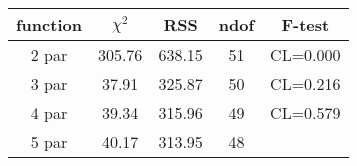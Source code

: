 \begin{tabular}{c|c|c|c|c}
function & $\chi^2$ & RSS & ndof & F-test \\
\hline
2 par & 305.76 & 638.15 & 51 & CL=0.000 \\
3 par & 37.91 & 325.87 & 50 & CL=0.216 \\
4 par & 39.34 & 315.96 & 49 & CL=0.579 \\
5 par & 40.17 & 313.95 & 48 & \\
\hline
\end{tabular}